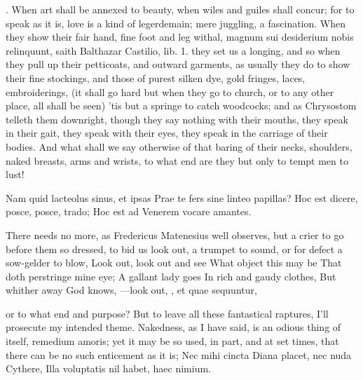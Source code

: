 {. When art shall
be annexed to beauty, when wiles and guiles shall concur; for to speak
as it is, love is a kind of legerdemain; mere juggling, a fascination.
When they show their fair hand, fine foot and leg withal, magnum sui
desiderium nobis relinquunt, saith Balthazar Castilio, lib. 1.
they set us a longing, and so when they pull up their petticoats, and
outward garments, as usually they do to show their fine stockings, and
those of purest silken dye, gold fringes, laces, embroiderings, (it
shall go hard but when they go to church, or to any other place, all
shall be seen) 'tis but a springe to catch woodcocks; and as
Chrysostom telleth them downright, though they say nothing with
their mouths, they speak in their gait, they speak with their eyes,
they speak in the carriage of their bodies. And what shall we say
otherwise of that baring of their necks, shoulders, naked breasts, arms
and wrists, to what end are they but only to tempt men to lust!

Nam quid lacteolus sinus, et ipsas
Prae te fers sine linteo papillas?
Hoc est dicere, posce, posce, trado;
Hoc est ad Venerem vocare amantes.

There needs no more, as Fredericus Matenesius well observes, but
a crier to go before them so dressed, to bid us look out, a trumpet to
sound, or for defect a sow-gelder to blow,
Look out, look out and see
What object this may be
That doth perstringe mine eye;
A gallant lady goes
In rich and gaudy clothes,
But whither away God knows,
---look out, \etc{}, et quae sequuntur,

or to what end and purpose? But to leave all these fantastical
raptures, I'll prosecute my intended theme. Nakedness, as I have said,
is an odious thing of itself, remedium amoris; yet it may be so used,
in part, and at set times, that there can be no such enticement as it
is;
Nec mihi cincta Diana placet, nec nuda Cythere,
Illa voluptatis nil habet, haec nimium.

}
